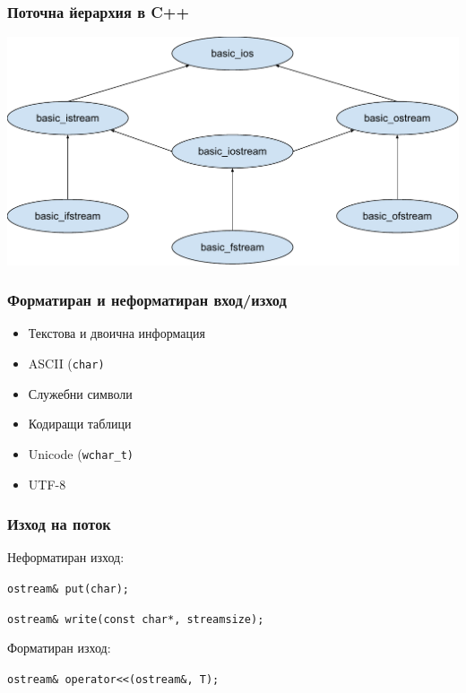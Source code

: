 \documentclass{beamer}
\begin{document}
\begin{frame}
  \frametitle{Поточна йерархия в C++}

  \includegraphics[width=\textwidth]{images/stream_hierarchy.pdf}
\end{frame}

\begin{frame}
  \frametitle{Форматиран и неформатиран вход/изход}

  \begin{itemize}
  \item Текстова и двоична информация
  \item ASCII (\tt{char})
  \item Служебни символи
  \item Кодиращи таблици
  \item Unicode (\tt{wchar\_t})
  \item UTF-8
  \end{itemize}
\end{frame}

\begin{frame}[fragile]
  \frametitle{Изход на поток}

  Неформатиран изход:
  \vspace{1em}

  \verb#ostream& put(char);#

  \verb#ostream& write(const char*, streamsize);#

  \vspace{3em}

  Форматиран изход:
  \vspace{1em}
  
  \verb#ostream& operator<<(ostream&, T);#
\end{frame}
\end{document}
